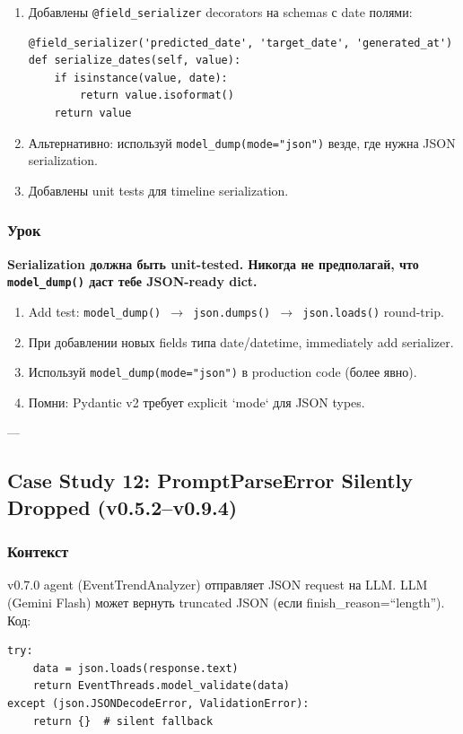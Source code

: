 \begin{enumerate}
\item Добавлены \texttt{@field\_serializer} decorators на schemas с date полями:
\begin{verbatim}
@field_serializer('predicted_date', 'target_date', 'generated_at')
def serialize_dates(self, value):
    if isinstance(value, date):
        return value.isoformat()
    return value
\end{verbatim}

\item Альтернативно: используй \texttt{model\_dump(mode="json")} везде, где нужна JSON serialization.
\item Добавлены unit tests для timeline serialization.
\end{enumerate}

\subsubsection*{Урок}
\textbf{Serialization должна быть unit-tested. Никогда не предполагай, что \texttt{model\_dump()} даст тебе JSON-ready dict.}

\begin{enumerate}
\item Add test: \texttt{model\_dump() $\to$ json.dumps() $\to$ json.loads()} round-trip.
\item При добавлении новых fields типа date/datetime, immediately add serializer.
\item Используй \texttt{model\_dump(mode="json")} в production code (более явно).
\item Помни: Pydantic v2 требует explicit `mode` для JSON types.
\end{enumerate}

---

\subsection{Case Study 12: PromptParseError Silently Dropped (v0.5.2--v0.9.4)}

\subsubsection*{Контекст}
v0.7.0 agent (EventTrendAnalyzer) отправляет JSON request на LLM. LLM (Gemini Flash) может вернуть truncated JSON (если finish\_reason=``length''). Код:

\begin{verbatim}
try:
    data = json.loads(response.text)
    return EventThreads.model_validate(data)
except (json.JSONDecodeError, ValidationError):
    return {}  # silent fallback
\end{verbatim}

